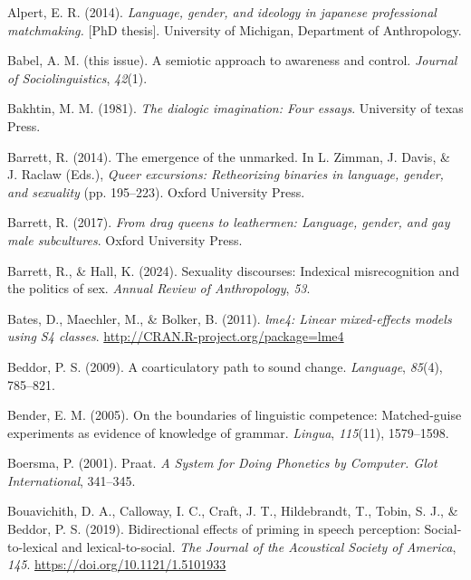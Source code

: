 \documentclass[
  letterpaper,
  DIV=11,
  numbers=noendperiod]{scrartcl}
\newlength{\cslhangindent}
\newenvironment{CSLReferences}[2] %
 {\begin{list}{}{%
  \setlength{\itemindent}{0pt}
  \setlength{\leftmargin}{0pt}
  \setlength{\parsep}{0pt}
  \ifodd #1
   \setlength{\leftmargin}{\cslhangindent}
   \setlength{\itemindent}{-1\cslhangindent}
  \fi
  \setlength{\itemsep}{#2\baselineskip}}}
 {\end{list}}
\begin{document}
\label{refs}
\begin{CSLReferences}{1}{0}
Alpert, E. R. (2014). \emph{Language, gender, and ideology in japanese
professional matchmaking.} {[}PhD thesis{]}. University of Michigan,
Department of Anthropology.

Babel, A. M. (this issue). A semiotic approach to awareness and control.
\emph{Journal of Sociolinguistics}, \emph{42}(1).

Bakhtin, M. M. (1981). \emph{The dialogic imagination: Four essays}.
University of texas Press.

Barrett, R. (2014). The emergence of the unmarked. In L. Zimman, J.
Davis, \& J. Raclaw (Eds.), \emph{Queer excursions: Retheorizing
binaries in language, gender, and sexuality} (pp. 195--223). Oxford
University Press.

Barrett, R. (2017). \emph{From drag queens to leathermen: Language,
gender, and gay male subcultures}. Oxford University Press.

Barrett, R., \& Hall, K. (2024). Sexuality discourses: Indexical
misrecognition and the politics of sex. \emph{Annual Review of
Anthropology}, \emph{53}.

Bates, D., Maechler, M., \& Bolker, B. (2011). \emph{lme4: Linear
mixed-effects models using S4 classes}.
\url{http://CRAN.R-project.org/package=lme4}

Beddor, P. S. (2009). A coarticulatory path to sound change.
\emph{Language}, \emph{85}(4), 785--821.

Bender, E. M. (2005). On the boundaries of linguistic competence:
Matched-guise experiments as evidence of knowledge of grammar.
\emph{Lingua}, \emph{115}(11), 1579--1598.

Boersma, P. (2001). Praat. \emph{A System for Doing Phonetics by
Computer. {Glot} {International}}, 341--345.

Bouavichith, D. A., Calloway, I. C., Craft, J. T., Hildebrandt, T.,
Tobin, S. J., \& Beddor, P. S. (2019). Bidirectional effects of priming
in speech perception: Social-to-lexical and lexical-to-social. \emph{The
Journal of the Acoustical Society of America}, \emph{145}.
\url{https://doi.org/10.1121/1.5101933}


\end{CSLReferences}
\end{document}

